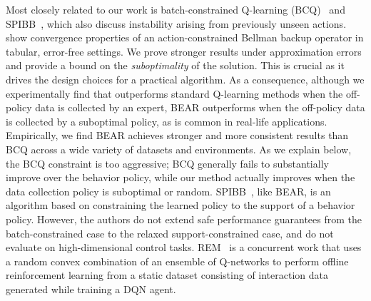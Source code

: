 Most closely related to our work is batch-constrained Q-learning (BCQ)~\citep{fujimoto2018off} and SPIBB~\citep{laroche2019spibb},
which also discuss instability arising from previously unseen actions. \citet{fujimoto2018off} show convergence properties of an action-constrained Bellman backup operator in tabular, error-free settings. We prove stronger results under approximation errors and provide a bound on the \emph{suboptimality} of the solution. This is crucial as it drives the design choices for a practical algorithm. 
As a consequence, although we experimentally find that \citep{fujimoto2018off} outperforms standard Q-learning methods when the off-policy data is collected by an expert, BEAR outperforms \cite{fujimoto2018off} when the off-policy data is collected by a suboptimal policy, as is common in real-life applications. Empirically, we find BEAR  achieves stronger and more consistent results than BCQ across a wide variety of datasets and environments. As we explain below, the BCQ constraint is too aggressive;  BCQ generally fails to substantially improve over the behavior policy, while our method actually improves when the data collection policy is suboptimal or random. SPIBB~\citep{laroche2019spibb}, like BEAR, is an algorithm based on constraining the learned policy to the support of a behavior policy. However, the authors do not extend safe performance guarantees from the batch-constrained case to the relaxed support-constrained case, and do not evaluate on high-dimensional control tasks. REM~\citep{agarwal19striving} is a concurrent work that uses a random convex combination of an ensemble of Q-networks to perform offline reinforcement learning from a static dataset consisting of interaction data generated while training a DQN agent.

